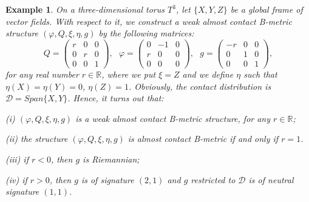 \documentclass{article}
\newtheorem{example}[theorem]{Example}
\begin{document}
\begin{example}
On a three-dimensional torus $T^3$, let $\{X,Y,Z\}$ be a global frame of vector fields. With respect to it, we construct a weak almost contact B-metric structure $(\varphi,Q,\xi,\eta,g)$ by the following matrices: 
$$Q=
\begin{pmatrix}
	r & 0 & 0 \\
	0 & r  & 0 \\
	0 & 0 & 1
\end{pmatrix}, \ \ \
\varphi=
\begin{pmatrix}
	0 & -1 & 0 \\
	r & 0  & 0 \\
	0 & 0 & 0
\end{pmatrix}, \ \ \
g= \begin{pmatrix}
	-r & 0 & 0 \\
	0 & 1  & 0 \\
	0 & 0 & 1
\end{pmatrix},
$$
for any real number $r\in\mathbb{R}$, where we put $\xi=Z$ and we define $\eta$ such that $\eta(X)=\eta(Y)=0$, $\eta(Z)=1$. Obviously, the contact distribution is $\mathcal{D}=Span\{X,Y\}$. Hence, it turns out that:\medskip

\noindent (i) $(\varphi, Q, \xi,\eta,g)$ is a weak almost contact B-metric structure, for any $ r \in \mathbb{R}$;\smallskip

\noindent (ii)  the structure  $(\varphi,Q,\xi,\eta,g)$ is almost contact B-metric if and only if $r=1$.\smallskip

\noindent (iii) if $r<0$, then $g$ is Riemannian;\smallskip

\noindent (iv) if $r>0$, then $g$ is of signature $(2,1)$ and $g$ restricted to $\mathcal{D}$ is of neutral signature $(1,1)$. 	
\end{example}
\end{document}
